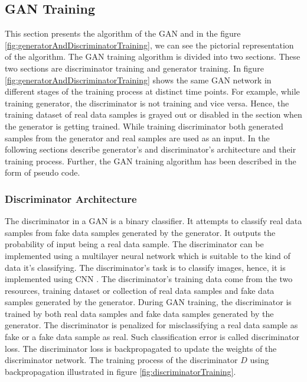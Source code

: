 \subsection{\ac{GAN} Training}

This section presents the algorithm of the \ac{GAN} and in the figure \ref{fig:generatorAndDiscriminatorTraining}, we can see the pictorial representation of the algorithm. The GAN training algorithm is divided into two sections. These two sections are discriminator training and generator training. In figure \ref{fig:generatorAndDiscriminatorTraining} shows the same GAN network in different stages of the training process at distinct time points. For example, while training generator, the discriminator is not training and vice versa. Hence, the training dataset of real data samples is grayed out or disabled in the section when the generator is getting trained. While training discriminator both generated samples from the generator and real samples are used as an input. In the following sections describe generator's and discriminator's architecture and their training process. Further, the \ac{GAN} training algorithm has been described in the form of pseudo code.

\subsubsection{Discriminator Architecture}\label{TheDiscriminatorSubSection}

The discriminator in a \ac{GAN} is a binary classifier. It attempts to classify real data samples from fake data samples generated by the generator. It outputs the probability of input being a real data sample. The discriminator can be implemented using a multilayer neural network which is suitable to the kind of data it's classifying. The discriminator's task is to classify images, hence, it is implemented using \ac{CNN} \cite{radford2016unsupervised}. The discriminator's training data come from the two resources, training dataset or collection of real data samples and fake data samples generated by the generator. During \ac{GAN} training, the discriminator is trained by both real data samples and fake data samples generated by the generator. The discriminator is penalized for misclassifying a real data sample as fake or a fake data sample as real. Such classification error is called discriminator loss. The discriminator loss is backpropagated to update the weights of the discriminator network. The training process of the discriminator $D$ using backpropagation illustrated in figure \ref{fig:discriminatorTraining}.


